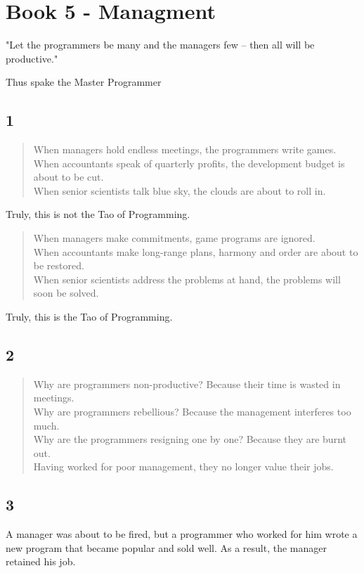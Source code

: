 \documentclass[14pt, letterpaper]{book}
\begin{document}
\chapter*{Book 5 - Managment}
\epigraph{"Let the programmers be many and the managers few -- then all will be productive."}{Thus spake the Master Programmer}

\section*{1}

\begin{verse}
When managers hold endless meetings, the programmers write games. \\
When accountants speak of quarterly profits, the development budget is about to be cut. \\
When senior scientists talk blue sky, the clouds are about to roll in.\\
\end{verse}

Truly, this is not the Tao of Programming.\\
\begin{verse}
When managers make commitments, game programs are ignored. \\
When accountants make long-range plans, harmony and order are about to be restored. \\
When senior scientists address the problems at hand, the problems will soon be solved.\\
\end{verse}

Truly, this is the Tao of Programming.

\section*{2}

\begin{verse}
    Why are programmers non-productive? Because their time is wasted in meetings. \\
    Why are programmers rebellious? Because the management interferes too much. \\
    Why are the programmers resigning one by one? Because they are burnt out. \\
    Having worked for poor management, they no longer value their jobs.\\
\end{verse}

\section*{3}
A manager was about to be fired, but a programmer who worked for him wrote a new program that became popular and sold well. As a result, the manager retained his job.\\
\end{document}

